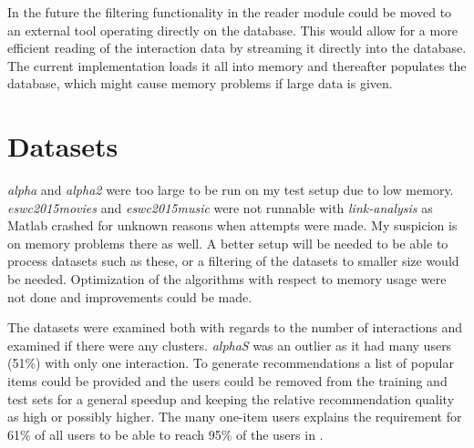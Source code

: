 

In the future the filtering functionality in the reader module could be moved to an external tool operating directly on the database. This would allow for a more efficient reading of the interaction data by streaming it directly into the database. The current implementation loads it all into memory and thereafter populates the database, which might cause memory problems if large data is given.



\section{Datasets}

\textit{alpha} and \textit{alpha2} were too large to be run on my test setup due to low memory. \textit{eswc2015movies} and \textit{eswc2015music} were not runnable with \textit{link-analysis} as Matlab crashed for unknown reasons when attempts were made. My suspicion is on memory problems there as well. A better setup will be needed to be able to process datasets such as these, or a filtering of the datasets to smaller size would be needed. Optimization of the algorithms with respect to memory usage were not done and improvements could be made.


The datasets were examined both with regards to the number of interactions and examined if there were any clusters. \textit{alphaS} was an outlier as it had many users (51\%) with only one interaction. To generate recommendations a list of popular items could be provided and the users could be removed from the training and test sets for a general speedup and keeping the relative recommendation quality as high or possibly higher. The many one-item users explains the requirement for 61\% of all users to be able to reach 95\% of the users in .

